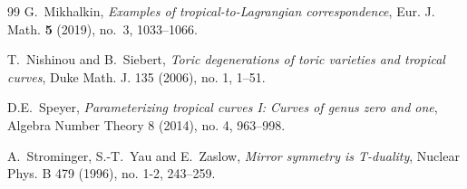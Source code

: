 \documentclass{article}
\theoremstyle{definition}
\begin{document}
\begin{thebibliography}{99}
          G.~Mikhalkin, \emph{Examples of tropical-to-Lagrangian correspondence}, Eur. J. Math. \textbf{5} (2019), no.~3, 1033--1066.

         T.~Nishinou and B.~Siebert, \emph{Toric degenerations of toric varieties and tropical curves}, Duke Math. J. 135 (2006), no. 1, 1–51.

         D.E.~Speyer, \emph{Parameterizing tropical curves I: Curves of genus zero and one}, Algebra Number Theory 8 (2014), no. 4, 963–998.
        
         A.~Strominger, S.-T.~Yau and E.~Zaslow, \emph{Mirror symmetry is T-duality}, Nuclear Phys. B 479 (1996), no. 1-2, 243–259.  

        
    \end{thebibliography}
	
	
	
	
	
\end{document}
